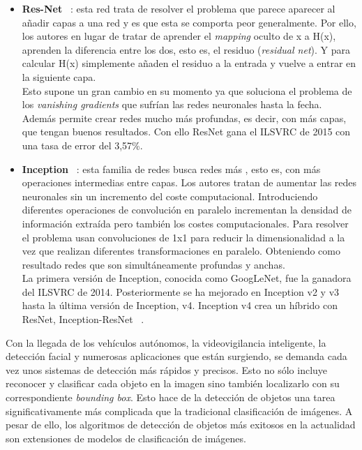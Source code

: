 \documentclass{bmvc2k}
\begin{document}
\begin{itemize}
\item \textbf{Res-Net} ~\cite{he2016deep}: esta red trata de resolver el problema que parece aparecer al añadir capas a una red y es que esta se comporta peor generalmente. Por ello, los autores en lugar de tratar de aprender el \textit{mapping} oculto de x a H(x), aprenden la diferencia entre los dos, esto es, el residuo (\textit{residual net}). Y para calcular H(x) simplemente añaden el residuo a la entrada y vuelve a entrar en la siguiente capa.\\ Esto supone un gran cambio en su momento ya que soluciona el problema de los \textit{vanishing gradients} que sufrían las redes neuronales hasta la fecha. Además permite crear redes mucho más profundas, es decir, con más capas, que tengan buenos resultados. Con ello ResNet gana el ILSVRC de 2015 con una tasa de error del 3,57\%.
\item \textbf{Inception} ~\cite{szegedy2015going}: esta familia de redes busca redes más , esto es, con más operaciones intermedias entre capas. Los autores tratan de aumentar las redes neuronales sin un incremento del coste computacional. Introduciendo diferentes operaciones de convolución en paralelo incrementan la densidad de información extraída pero también los costes computacionales. Para resolver el problema usan convoluciones de 1x1 para reducir la dimensionalidad a la vez que realizan diferentes transformaciones en paralelo. Obteniendo como resultado redes que son simultáneamente profundas y anchas.\\
La primera versión de Inception, conocida como GoogLeNet, fue la ganadora del ILSVRC de 2014. Posteriormente se ha mejorado en Inception v2 y v3 hasta la última versión de Inception, v4. Inception v4 crea un híbrido con ResNet, Inception-ResNet ~\cite{szegedy2017inception}.
\end{itemize}
Con la llegada de los vehículos autónomos, la videovigilancia inteligente, la detección facial y numerosas aplicaciones que están surgiendo, se demanda cada vez unos sistemas de detección más rápidos y precisos. Esto no sólo incluye reconocer y clasificar cada objeto en la imagen sino también localizarlo con su correspondiente \textit{bounding box}. Esto hace de la detección de objetos una tarea significativamente más complicada que la tradicional clasificación de imágenes. A pesar de ello, los algoritmos de detección de objetos más exitosos en la actualidad son extensiones de modelos de clasificación de imágenes.\\
\end{document}
